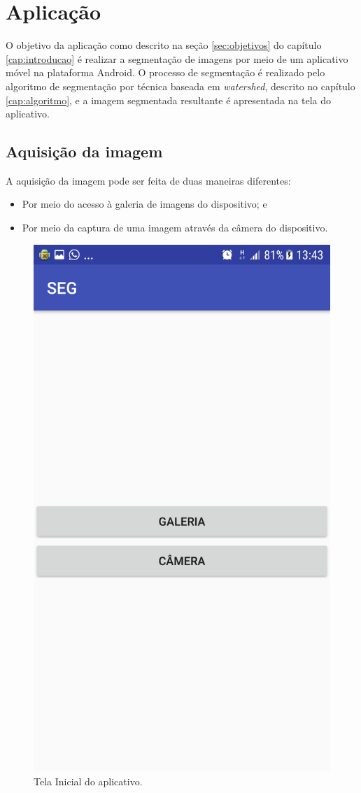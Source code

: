 \chapter{Aplicação}\label{cap:aplicacao}

O objetivo da aplicação como descrito na seção \ref{sec:objetivos} do capítulo \ref{cap:introducao} é realizar a segmentação de imagens por meio de um aplicativo móvel na plataforma Android.
O processo de segmentação é realizado pelo algoritmo de segmentação por técnica baseada em \textit{watershed}, descrito no capítulo \ref{cap:algoritmo}, e a imagem segmentada resultante é apresentada na tela do aplicativo.

\section{Aquisição da imagem}\label{sec:aquisicao_aplicacao}

A aquisição da imagem pode ser feita de duas maneiras diferentes: 

\begin{itemize}
    \item Por meio do acesso à galeria de imagens do dispositivo; e
    \item Por meio da captura de uma imagem através da câmera do dispositivo.
\end{itemize}

  \begin{figure}[!htb]
       \begin{center}  
          \includegraphics[width=0.3\columnwidth]{img/telainicial_app.png}
           \caption{\label{fig:telainicial_app}Tela Inicial do aplicativo.}
       \end{center}
   \end{figure}


